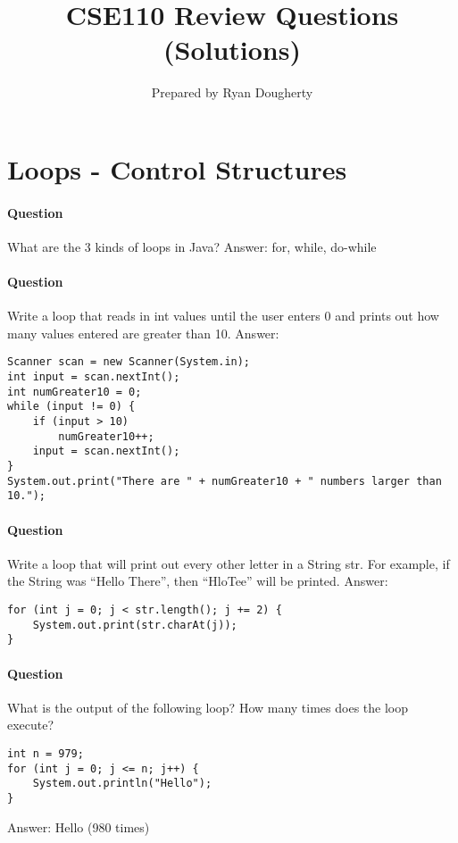\documentclass{article}
\title{CSE110 Review Questions (Solutions)}
\author{Prepared by Ryan Dougherty}
\date{}
\begin{document}
\maketitle

\section*{Loops - Control Structures}


\setcounter{question_num}{1}

\setcounter{question_num}{1}
\paragraph{Question }
What are the 3 kinds of loops in Java? {\color{red}Answer: for, while, do-while}

\addtocounter{question_num}{1}
\paragraph{Question }
Write a loop that reads in int values until the user enters 0 and prints out how many values entered are greater than 10.
\newline
{\color{red}Answer:}
\begin{lstlisting}
Scanner scan = new Scanner(System.in);
int input = scan.nextInt();
int numGreater10 = 0;
while (input != 0) {
	if (input > 10)
		numGreater10++;
	input = scan.nextInt();
}
System.out.print("There are " + numGreater10 + " numbers larger than 10.");
\end{lstlisting}

\addtocounter{question_num}{1}
\paragraph{Question }
Write a loop that will print out every other letter in a String str. For example, if the String was \enquote{Hello There}, then \enquote{HloTee} will be printed.
\newline
{\color{red}Answer:}
\begin{lstlisting}
for (int j = 0; j < str.length(); j += 2) {
	System.out.print(str.charAt(j));
}
\end{lstlisting}

\addtocounter{question_num}{1}
\paragraph{Question }
What is the output of the following loop? How many times does the loop execute?
\begin{lstlisting}
int n = 979;
for (int j = 0; j <= n; j++) {
	System.out.println("Hello");
}
\end{lstlisting}
{\color{red}Answer: Hello (980 times)}
\end{document}
